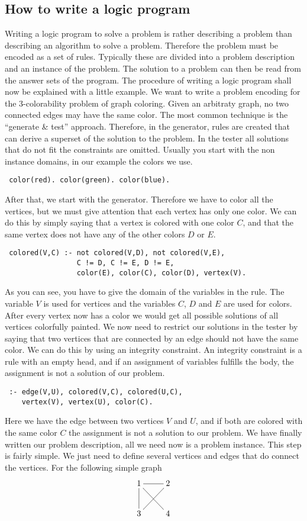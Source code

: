 \documentclass[a4paper,10pt]{article}
\begin{document}
\subsection{How to write a logic program}
Writing a logic program to solve a problem is rather describing a problem than describing an algorithm to solve a problem.
Therefore the problem must be encoded as a set of rules.
Typically these are divided into a problem description and an instance of the problem.
The solution to a problem can then be read from the answer sets of the program.
The procedure of writing a logic program shall now be explained with a little example.
We want to write a problem encoding for the 3-colorability problem of graph coloring.
Given an arbitraty graph, no two connected edges may have the same color.
The most common technique is the ``generate \& test'' approach. Therefore, in the generator, rules are created that can derive a superset of the solution to the problem. In the tester all solutions that do not fit the constraints are omitted.
\newline
Usually you start with the non instance domains, in our example the colors we use.
\begin{verbatim}
 color(red). color(green). color(blue).
\end{verbatim}
After that, we start with the generator.
Therefore we have to color all the vertices, but we must give attention that each vertex has only one color.
We can do this by simply saying that a vertex is colored with one color $C$, and that the same vertex does not have any of the other colors $D$ or $E$.
\begin{verbatim}
 colored(V,C) :- not colored(V,D), not colored(V,E),
                 C != D, C != E, D != E,
                 color(E), color(C), color(D), vertex(V).
\end{verbatim}
As you can see, you have to give the domain of the variables in the rule.
The variable $V$ is used for vertices and the variables $C$, $D$ and $E$ are used for colors.
After every vertex now has a color we would get all possible solutions of all vertices colorfully painted.
We now need to restrict our solutions in the tester by saying that two vertices that are connected by an edge should not have the same color.
We can do this by using an integrity constraint.
An integrity constraint is a rule with an empty head, and if an assignment of variables fulfills the body, the assignment is not a solution of our problem.
\begin{verbatim}
 :- edge(V,U), colored(V,C), colored(U,C),
    vertex(V), vertex(U), color(C).
\end{verbatim}
Here we have the edge between two vertices $V$ and $U$, and if both are colored with the same color $C$ the assignment is not a solution to our problem.
\newline
We have finally written our problem description, all we need now is a problem instance. This step is fairly simple.
We just need to define several vertices and edges that do connect the vertices.
For the following simple graph
\[
 \xymatrix{1\ar@{-}[dr]\ar@{-}[d]\ar@{-}[r]&2\ar@{-}[dl]\\
           3&4}
\]
\end{document}
